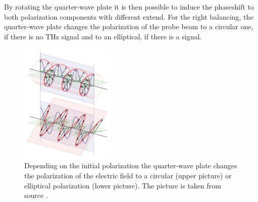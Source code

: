 By rotating the quarter-wave plate it is then possible to induce the phaseshift to both polarization components with different extend.
For the right balancing, the quarter-wave plate changes the polarization of the probe beam to a circular one, if there is no $\si{\tera\hertz}$ signal and to an elliptical, if there is a signal.
\begin{figure}
    \centering
    \includegraphics[width=0.4\textwidth]{refferenced_pic/qwp.png}
    \caption{Depending on the initial polarization the quarter-wave plate changes the polarization of the electric field to a circular (upper picture) or elliptical polarization (lower picture).
    The picture is taken from source \cite{qwp}.}
    \label{fig:qwp}
\end{figure}
\FloatBarrier
